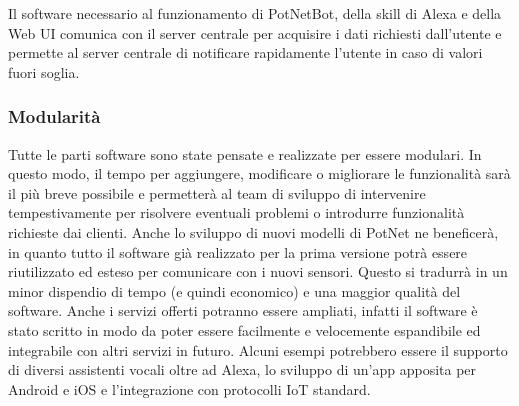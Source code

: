 Il software necessario al funzionamento di PotNetBot, della skill di Alexa e della Web UI comunica con il server centrale per acquisire i dati richiesti dall'utente e permette al server centrale di notificare rapidamente l'utente in caso di valori fuori soglia. 

\subsubsection{Modularità}

Tutte le parti software sono state pensate e realizzate per essere modulari. In questo modo, il tempo per aggiungere, modificare o migliorare le funzionalità sarà il più breve possibile e permetterà al team di sviluppo di intervenire tempestivamente per risolvere eventuali problemi o introdurre funzionalità richieste dai clienti.
\newline Anche lo sviluppo di nuovi modelli di PotNet ne beneficerà, in quanto tutto il software già realizzato per la prima versione potrà essere riutilizzato ed esteso per comunicare con i nuovi sensori. Questo si tradurrà in un minor dispendio di tempo (e quindi economico) e una maggior qualità del software.
\newline\newline Anche i servizi offerti potranno essere ampliati, infatti il software è stato scritto in modo da poter essere facilmente e velocemente espandibile ed integrabile con altri servizi in futuro. Alcuni esempi potrebbero essere il supporto di diversi assistenti vocali oltre ad Alexa, lo sviluppo di un'app apposita per Android e iOS e l'integrazione con protocolli IoT standard.